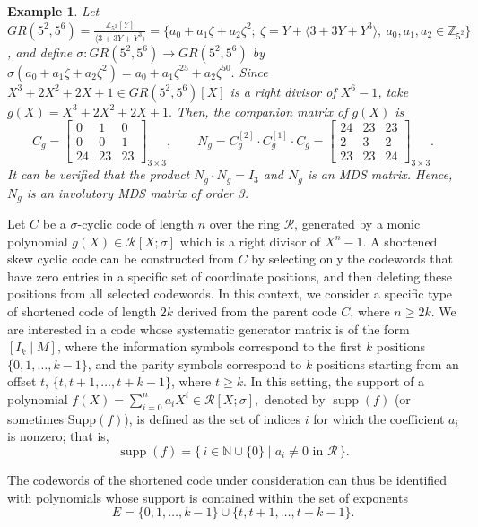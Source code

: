 \documentclass[11pt]{article}
\newtheorem{example}{Example}
\begin{document}
\begin{example}
Let $GR(5^2, 5^6)=\frac{\mathbb{Z}_{5^2}[Y]}{\langle 3+3Y+Y^3\rangle}=\{a_0+a_1\zeta+a_2\zeta^2;~\zeta=Y+\langle 3+3Y+Y^3\rangle, ~a_0,a_1,a_2\in \mathbb{Z}_{5^2} \}$, and define $\sigma :GR(5^2, 5^6) \longrightarrow GR(5^2, 5^6)$ by 
\(
\sigma(a_0+a_1\zeta+a_2\zeta^2) = a_0+a_1\zeta^{25}+a_2\zeta^{50}.
\) Since $X^3 + 2X^2+2X+1 \in GR(5^2,5^6)[X]$ is a right divisor of $X^6 - 1$, take
\(
g(X) = X^3 + 2X^2+2X+1.
\)
Then, the companion matrix of $g(X)$ is
\[
C_g = \begin{bmatrix}
0 & 1&0 \\
0&0&1\\
24 &23&23 
\end{bmatrix}_{3\times 3}, 
\qquad 
N_g=C_g^{[2]}\cdot C_g^{[1]}\cdot C_g = \begin{bmatrix}
24&23&23\\
2&3&2\\
23&23&24
\end{bmatrix}_{3\times 3}.
\]
It can be verified that the product 
\(N_g\cdot N_g 
= I_{3}
\) and $N_g$ is an MDS matrix. Hence, $N_g$ is an involutory MDS matrix of order 3.
\end{example}

\noindent Let $C$ be a $\sigma$-cyclic code of length $n$ over the ring $\mathcal{R}$, generated by a monic polynomial 
$g(X) \in \mathcal{R}[X; \sigma]$ which is a right divisor of $X^n - 1$. A shortened skew cyclic code can be 
constructed from $C$ by selecting only the codewords that have zero entries in a specific set of coordinate positions, 
and then deleting these positions from all selected codewords. In this context, we consider a specific type of shortened 
code of length $2k$ derived from the parent code $C$, where $n\geq 2k $. We are interested in a code whose systematic generator matrix is 
of the form $[I_k \mid M]$, where the information symbols correspond to the first $k$ positions 
$\{0, 1, \dots, k-1\}$, and the parity symbols correspond to $k$ positions starting from an offset $t$, 
$\{t, t+1, \dots, t+k-1\}$, where $t\geq k$. In this setting, the support of a polynomial 
\(
f(X) = \sum_{i=0}^n a_i X^i \in \mathcal{R}[X; \sigma],
\)
denoted by $\operatorname{supp}(f)$ (or sometimes $\mathrm{Supp}(f)$), is defined as the set of indices $i$ for which 
the coefficient $a_i$ is nonzero; that is,
\[
\operatorname{supp}(f) = \{\, i \in \mathbb{N}\cup \{0\} \mid a_i \neq 0 \text{ in } \mathcal{R} \,\}.
\]

The codewords of the shortened code under consideration can thus be identified with polynomials whose support is 
contained within the set of exponents
\[
E = \{0, 1, \dots, k-1\} \cup \{t, t+1, \dots, t+k-1\}.
\]
\end{document}
